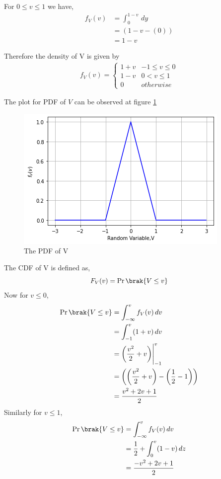 For $0 \le v \le 1$ we have, 
\begin{align}
    f_V(v) &=   \int_{0}^{1-v} \,dy  \\
          &= (1-v - (0)) \\
          &= 1-v
\end{align}

Therefore the density of V is given by
\begin{align}
\label{june2018-50eq:pdf_v}
f_{V}(v)  = 
\begin{cases}
1+v & -1 \le v \le 0
\\
1-v & 0 < v \le 1
\\
0 & otherwise
\end{cases}
\end{align}

The plot for PDF of $V $ can be observed at figure \ref{june2018-50fig:The PDF of V}
\begin{figure}[!ht]
       \centering
    \includegraphics[width=\columnwidth] {solutions/2018/june/50/Assignment_3_Fig_1.png}
    \caption{The PDF of V}
    \label{june2018-50fig:The PDF of V}
\end{figure}

The CDF of V is defined as,
\begin{equation}
    F_V(v) = \Pr\brak{V \le v}
\end{equation}
Now for $ v \le 0 $,
 \begin{align}
    \Pr\brak{V\le v} &=  \int_{-\infty}^{v}f_{V}(v) \,dv  \\
          &=  \int_{-1}^{v} (1+v) \,dv  \\
          &=  \left(\dfrac{v^2}{2}+v \right) \Biggr|_{-1}^{v}  \\
          &=   \left(\left(\dfrac{v^2}{2}+v \right) - \left(\dfrac{1}{2} -1 \right)\right) \\
          &= \dfrac{v^2+2v +1}{2}
\end{align}
Similarly for $v \le 1$,
\begin{align}
    \Pr\brak{V\le v} &=  \int_{-\infty}^{v}f_{V}(v) \,dv  \\
          &=  \dfrac{1}{2} + \int_{0}^{v}(1-v)\,dz  \\
          &=  \dfrac{-v^2+2v+1}{2}
\end{align}


